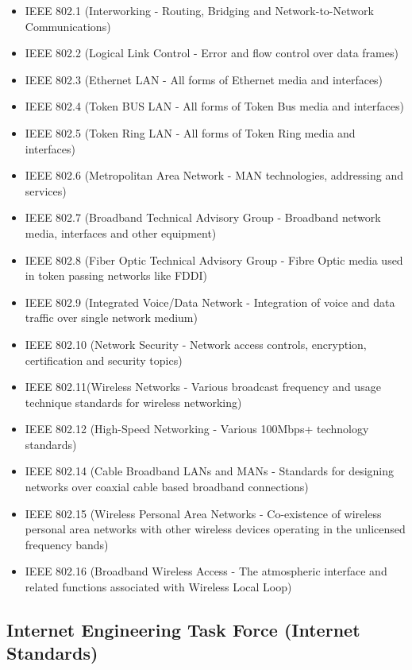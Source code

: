 \begin{itemize}

\item IEEE 802.1 (Interworking - Routing, Bridging and Network-to-Network Communications)
\item IEEE 802.2 (Logical Link Control - Error and flow control over data frames) 
\item IEEE 802.3 (Ethernet LAN - All forms of Ethernet media and interfaces)
\item IEEE 802.4 (Token BUS LAN - All forms of Token Bus media and interfaces) 
\item IEEE 802.5 (Token Ring LAN - All forms of Token Ring media and interfaces)
\item IEEE 802.6 (Metropolitan Area Network - MAN technologies, addressing and services)
\item IEEE 802.7 (Broadband Technical Advisory Group - Broadband  network media, interfaces and other equipment)
\item IEEE 802.8 (Fiber Optic Technical Advisory Group - Fibre Optic media used in token passing networks like FDDI)
\item IEEE 802.9 (Integrated Voice/Data Network - Integration of voice and data traffic over single network medium)
\item IEEE 802.10 (Network Security - Network access controls, encryption, certification and security topics)
\item IEEE 802.11(Wireless Networks - Various broadcast frequency and usage technique standards for wireless networking)
\item IEEE 802.12 (High-Speed Networking - Various 100Mbps+ technology standards)
\item IEEE 802.14 (Cable Broadband LANs and MANs - Standards for designing networks over coaxial cable based broadband connections)
\item IEEE 802.15 (Wireless Personal Area Networks - Co-existence of wireless personal area networks with other wireless devices operating in the unlicensed frequency bands)
\item IEEE 802.16 (Broadband Wireless Access - The atmospheric interface and related functions associated with Wireless Local Loop) 

\end{itemize}



\subsection{Internet Engineering Task Force (Internet Standards)}


